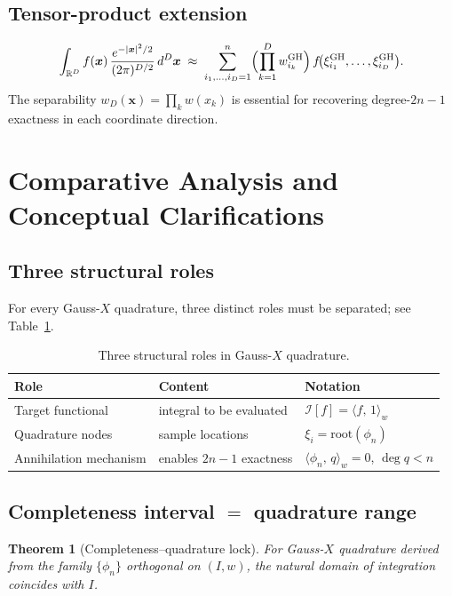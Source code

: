\documentclass[11pt,a4paper]{article}
\newtheorem{theorem}{Theorem}[section]
\theoremstyle{definition}
\newcommand{\R}{\mathbb{R}}
\newcommand{\ipw}[2]{\langle #1,\, #2 \rangle_{w}}
\newcommand{\I}{\mathcal{I}}
\newcommand{\GH}{\mathrm{GH}}
\begin{document}
\subsection{Tensor-product extension}

\[
  \int_{\R^D} f(\bm{x})\,\frac{e^{-|\bm{x}|^2/2}}{(2\pi)^{D/2}}\,d^D\bm{x}
  \;\approx\;
  \sum_{i_1,\ldots,i_D=1}^{n}
  \Bigl(\prod_{k=1}^{D} w_{i_k}^{\GH}\Bigr)\,
  f\!\bigl(\xi_{i_1}^{\GH},\ldots,\xi_{i_D}^{\GH}\bigr).
\]
The separability $w_D(\bm{x})=\prod_k w(x_k)$ is essential for recovering
degree-$2n-1$ exactness in each coordinate direction.

\section{Comparative Analysis and Conceptual Clarifications}\label{sec:compare}

\subsection{Three structural roles}

For every Gauss-$X$ quadrature, three distinct roles must be separated; see
Table~\ref{tab:three-roles}.

\begin{table}[ht]
\centering
\caption{Three structural roles in Gauss-$X$ quadrature.}
\label{tab:three-roles}
\begin{tabular}{lll}
\toprule
Role & Content & Notation \\
\midrule
Target functional        & integral to be evaluated      & $\I[f]=\ipw{f}{1}$ \\
Quadrature nodes         & sample locations              & $\xi_i=\mathrm{root}(\phi_n)$ \\
Annihilation mechanism   & enables $2n-1$ exactness      & $\ipw{\phi_n}{q}=0$, $\deg q<n$ \\
\bottomrule
\end{tabular}
\end{table}

\subsection{Completeness interval $=$ quadrature range}

\begin{theorem}[Completeness--quadrature lock]\label{thm:lock}
For Gauss-$X$ quadrature derived from the family $\{\phi_n\}$ orthogonal on
$(I,w)$, the natural domain of integration coincides with $I$.
\end{theorem}
\end{document}
